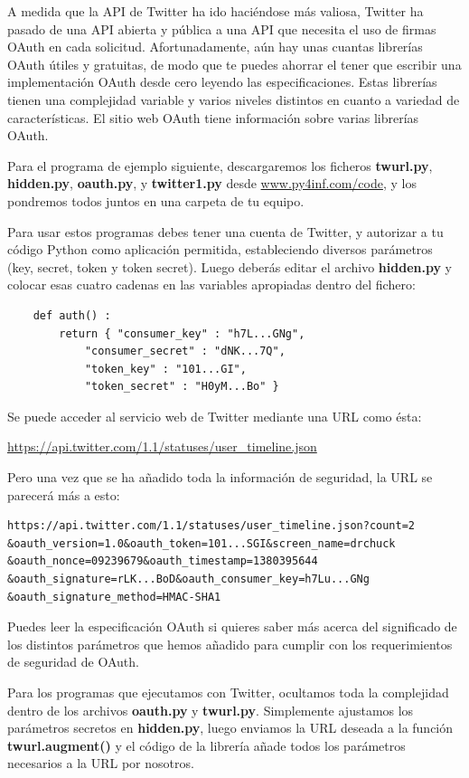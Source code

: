 A medida que la API de Twitter ha ido haciéndose más valiosa, Twitter
ha pasado de una API abierta y pública a una API que necesita
el uso de firmas OAuth en cada solicitud. Afortunadamente,
aún hay unas cuantas librerías OAuth útiles y gratuitas,
de modo que te puedes ahorrar el tener que escribir una implementación OAuth
desde cero leyendo las especificaciones. Estas librerías tienen
una complejidad variable y varios niveles distintos en cuanto a variedad de características.
El sitio web OAuth tiene información sobre varias librerías OAuth.

Para el programa de ejemplo siguiente, descargaremos los ficheros
{\bf twurl.py}, {\bf hidden.py}, 
{\bf oauth.py}, 
y
{\bf twitter1.py} desde
\url{www.py4inf.com/code}, y los pondremos todos juntos en una carpeta
de tu equipo.

Para usar estos programas debes tener una cuenta de Twitter,
y autorizar a tu código Python como aplicación permitida,
estableciendo diversos parámetros (key, secret, token y token secret). Luego deberás editar
el archivo {\bf hidden.py} y colocar esas cuatro cadenas en las
variables apropiadas dentro del fichero:

\beforeverb
\begin{verbatim}
    def auth() :
        return { "consumer_key" : "h7L...GNg",
            "consumer_secret" : "dNK...7Q",
            "token_key" : "101...GI",
            "token_secret" : "H0yM...Bo" }
\end{verbatim}
\afterverb
%
Se puede acceder al servicio web de Twitter mediante una URL como ésta:

\url{https://api.twitter.com/1.1/statuses/user_timeline.json}

Pero una vez que se ha añadido toda la información de seguridad, la URL
se parecerá más a esto:

\beforeverb
\begin{verbatim}
https://api.twitter.com/1.1/statuses/user_timeline.json?count=2
&oauth_version=1.0&oauth_token=101...SGI&screen_name=drchuck
&oauth_nonce=09239679&oauth_timestamp=1380395644
&oauth_signature=rLK...BoD&oauth_consumer_key=h7Lu...GNg
&oauth_signature_method=HMAC-SHA1
\end{verbatim}
\afterverb
%
Puedes leer la especificación OAuth si quieres saber más
acerca del significado de los distintos parámetros que
hemos añadido para cumplir con los requerimientos de seguridad de OAuth.

Para los programas que ejecutamos con Twitter, ocultamos toda la
complejidad dentro de los archivos {\bf oauth.py} y {\bf twurl.py}.
Simplemente ajustamos los parámetros secretos en {\bf hidden.py}, luego
enviamos la URL deseada a la función {\bf twurl.augment()}
y el código de la librería añade todos los parámetros
necesarios a la URL por nosotros.

